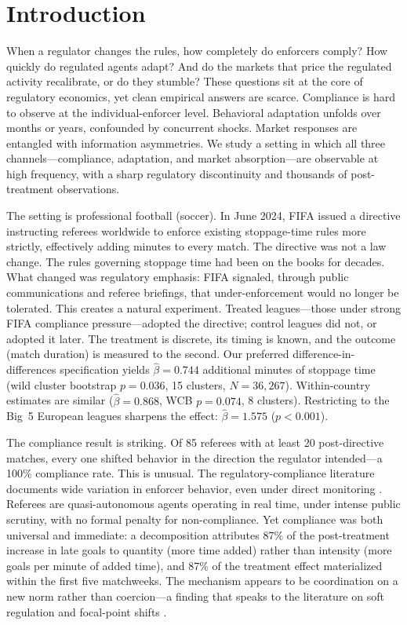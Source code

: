 \section{Introduction}\label{sec:intro}

When a regulator changes the rules, how completely do enforcers comply?
How quickly do regulated agents adapt?
And do the markets that price the regulated activity recalibrate, or do
they stumble?
These questions sit at the core of regulatory economics, yet clean
empirical answers are scarce.
Compliance is hard to observe at the individual-enforcer level.
Behavioral adaptation unfolds over months or years, confounded by
concurrent shocks.
Market responses are entangled with information asymmetries.
We study a setting in which all three channels---compliance, adaptation,
and market absorption---are observable at high frequency, with a sharp
regulatory discontinuity and thousands of post-treatment observations.

The setting is professional football (soccer).
In June 2024, FIFA issued a directive instructing referees worldwide to
enforce existing stoppage-time rules more strictly, effectively adding
minutes to every match.
The directive was not a law change.
The rules governing stoppage time had been on the books for decades.
What changed was regulatory emphasis: FIFA signaled, through public
communications and referee briefings, that under-enforcement would no
longer be tolerated.
This creates a natural experiment.
Treated leagues---those under strong FIFA compliance pressure---adopted
the directive; control leagues did not, or adopted it later.
The treatment is discrete, its timing is known, and the outcome
(match duration) is measured to the second.
Our preferred difference-in-differences specification yields
$\hat{\beta}=0.744$ additional minutes of stoppage time
(wild cluster bootstrap $p=0.036$, 15 clusters, $N=36{,}267$).
Within-country estimates are similar ($\hat{\beta}=0.868$, WCB $p=0.074$,
8 clusters).
Restricting to the Big~5 European leagues sharpens the effect:
$\hat{\beta}=1.575$ ($p<0.001$).

The compliance result is striking.
Of 85 referees with at least 20 post-directive matches, every one
shifted behavior in the direction the regulator intended---a 100\%
compliance rate.
This is unusual.
The regulatory-compliance literature documents wide variation in enforcer
behavior, even under direct monitoring
\citep{DufloGreenstoneHanna2013,FinanOlken2017}.
Referees are quasi-autonomous agents operating in real time, under
intense public scrutiny, with no formal penalty for non-compliance.
Yet compliance was both universal and immediate: a
\citet{Gelbach2016} decomposition attributes 87\% of the
post-treatment increase in late goals to quantity (more time added)
rather than intensity (more goals per minute of added time),
and 87\% of the treatment effect materialized within the first
five matchweeks.
The mechanism appears to be coordination on a new norm rather than
coercion---a finding that speaks to the literature on soft regulation
and focal-point shifts \citep{Sunstein1996,McAdams2000}.

